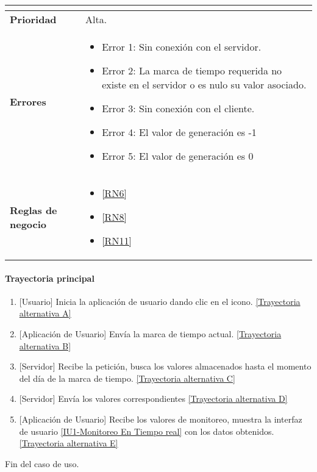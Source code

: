 \begin{longtable}{|J{5cm}|J{10.3cm}|}
\begin{itemize}
		\end{itemize} \\ \hline 
	\textbf{Prioridad} & 
		Alta. \\ \hline
	\textbf{Errores} & 
		\begin{itemize}
		    \item \label{CU5:Error1} Error 1: Sin conexión con el servidor.
			\item \label{CU5:Error2} Error 2: La marca de tiempo requerida no existe en el servidor o es nulo su valor asociado.
		    \item \label{CU5:Error3} Error 3: Sin conexión con el cliente.
		    \item \label{CU5:Error4} Error 4: El valor de generación es -1
		    \item \label{CU5:Error5} Error 5: El valor de generación es 0
		\end{itemize} \\ \hline
	\textbf{Reglas de negocio} & 
		\begin{itemize}
		    \item \ref{RN6}
			\item \ref{RN8}
			\item \ref{RN11}
		\end{itemize} \\ \hline

\end{longtable}

\paragraph{Trayectoria principal}
    \label{SUB-M-CU1.5:TP}
	\begin{enumerate}
	    \item {[Usuario]} Inicia la aplicación de usuario dando clic en el icono. \hyperref[SUB-M-CU5:TA]{[Trayectoria alternativa A]}
	    \item {[Aplicación de Usuario]} Envía la marca de tiempo actual. \hyperref[SUB-M-CU5:TB]{[Trayectoria alternativa B]} 
	    \item {[Servidor]} Recibe la petición, busca los valores almacenados hasta el momento del día de la marca de tiempo. \hyperref[SUB-M-CU5:TC]{[Trayectoria alternativa C]}
	    \item {[Servidor]} Envía los valores correspondientes \hyperref[SUB-M-CU5:TD]{[Trayectoria alternativa D]} 
	    \item {[Aplicación de Usuario]} Recibe los valores de monitoreo, muestra la interfaz de usuario \hyperref[fig:monitoreo]{[IU1-Monitoreo En Tiempo real]} con los datos obtenidos. \hyperref[SUB-M-CU5:TE]{[Trayectoria alternativa E]}
	\end{enumerate}
	Fin del caso de uso.

